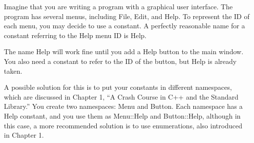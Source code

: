 
Imagine that you are writing a program with a graphical user interface. The program has several menus, including File, Edit, and Help. To represent the ID of each menu, you may decide to use a constant. A perfectly reasonable name for a constant referring to the Help menu ID is Help.

The name Help will work fine until you add a Help button to the main window. You also need a constant to refer to the ID of the button, but Help is already taken.

A possible solution for this is to put your constants in different namespaces, which are discussed in Chapter 1, “A Crash Course in C++ and the Standard Library.” You create two namespaces: Menu and Button. Each namespace has a Help constant, and you use them as Menu::Help and Button::Help, although in this case, a more recommended solution is to use enumerations, also introduced in Chapter 1.

